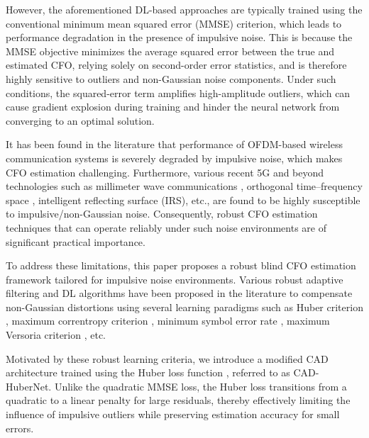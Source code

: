 \documentclass[10pt, journal]{IEEEtran}
\begin{document}
However, the aforementioned DL-based approaches are typically trained using the conventional minimum mean squared error (MMSE) criterion, which leads to performance degradation in the presence of impulsive noise. This is because the MMSE objective minimizes the average squared error between the true and estimated CFO, relying solely on second-order error statistics, and is therefore highly sensitive to outliers and non-Gaussian noise components. Under such conditions, the squared-error term amplifies high-amplitude outliers, which can cause gradient explosion during training and hinder the neural network from converging to an optimal solution. 

It has been found in the literature that performance of OFDM-based wireless communication systems \cite{feng2021message, jain2020ber} is severely degraded by impulsive noise, which makes CFO estimation challenging. Furthermore, various recent 5G and beyond technologies such as millimeter wave communications \cite{boro2025lhcaf}, orthogonal time–frequency space \cite{kumar2023channel}, intelligent reflecting surface (IRS), etc., are found to be highly susceptible to impulsive/non-Gaussian noise. Consequently, robust CFO estimation techniques that can operate reliably under such noise environments are of significant practical importance.

To address these limitations, this paper proposes a robust blind CFO estimation framework tailored for impulsive noise environments. Various robust adaptive filtering and DL algorithms have been proposed in the literature to compensate non-Gaussian distortions using several learning paradigms such as Huber criterion \cite{huber1964robust}, maximum correntropy criterion \cite{7426837, ranjan2024quaternion}, minimum symbol error rate \cite{6466344, jain2020kernel, mitra2020least}, maximum Versoria criterion \cite{10349689, jain2023sparsity, jain2025generalized}, etc. 

Motivated by these robust learning criteria, we introduce a modified CAD architecture trained using the Huber loss function \cite{huber1964robust}, referred to as CAD-HuberNet. Unlike the quadratic MMSE loss, the Huber loss transitions from a quadratic to a linear penalty for large residuals, thereby effectively limiting the influence of impulsive outliers while preserving estimation accuracy for small errors.
\end{document}
